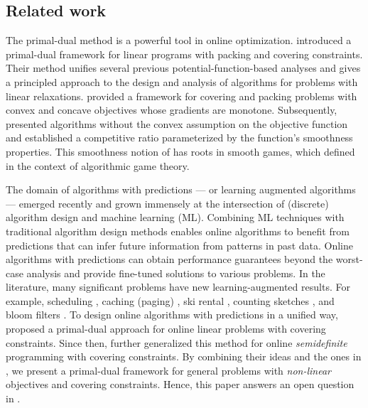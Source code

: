 \subsection{Related work}
The primal-dual method is a powerful tool in online optimization. \cite{BuchbinderNaor09:The-Design-of-Competitive} introduced a primal-dual framework for linear programs with packing and covering constraints. Their method unifies several previous potential-function-based analyses and gives a principled approach to the design and analysis of algorithms for problems with linear relaxations. \cite{AzarBuchbinder16:Online-Algorithms} provided a framework for covering and packing problems with convex and concave objectives whose gradients are monotone. Subsequently, \cite{Thang20:Online-Primal-Dual} presented algorithms without the convex assumption on the objective function and established a competitive ratio parameterized by the function's smoothness properties. This smoothness notion of \cite{Thang20:Online-Primal-Dual} has roots in smooth games, which \cite{Roughgarden15:Intrinsic-Robustness} defined in the context of algorithmic game theory.

The domain of algorithms with predictions \cite{MitzenmacherVassilvitskii20:Beyond-the-Worst-Case} --- or learning augmented algorithms --- emerged recently and grown immensely at the intersection of (discrete) algorithm design and machine learning (ML).
Combining ML techniques with traditional algorithm design methods enables online algorithms to benefit from predictions that can infer future information from patterns in past data. Online algorithms with predictions can obtain performance guarantees beyond the worst-case analysis and provide fine-tuned solutions to various problems. In the literature, many significant problems have new learning-augmented results. For example, scheduling \citep{LattanziLavastida20:Online-scheduling,Mitzenmacher20:Scheduling-with}, caching (paging) \citep{LykourisVassilvtiskii18:Competitive-caching,Rohatgi20:Near-optimal-bounds,AntoniadisCoester20:Online-metric}, ski rental \citep{GollapudiPanigrahi19:Online-algorithms,KumarPurohit18:Improving-online}, counting sketches \citep{HsuIndyk19:Learning-Based-Frequency}, and bloom filters \citep{KraskaBeutel18:The-case-for-learned,Mitzenmacher18:A-model-for-learned}.
To design online algorithms with predictions in a unified way, \cite{BamasMaggiori20:The-Primal-Dual-method} proposed a primal-dual approach for online linear problems with covering constraints. Since then, \cite{GrigorescuLin22:Learning-Augmented-Algorithms} further generalized this method for online \emph{semidefinite} programming with covering constraints. By combining their ideas and the ones in \cite{BuchbinderNaor09:The-Design-of-Competitive,AzarBuchbinder16:Online-Algorithms,Thang20:Online-Primal-Dual}, we present a primal-dual framework for general problems with \emph{non-linear} objectives and covering constraints. Hence, this paper answers an open question in \cite{BamasMaggiori20:The-Primal-Dual-method}.

